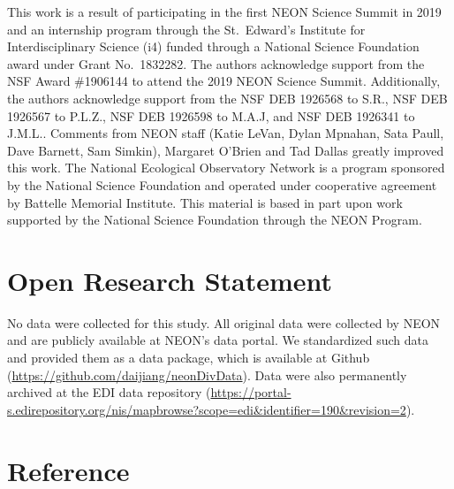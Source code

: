 \documentclass[
  12pt,
]{article}
\begin{document}
This work is a result of participating in the first NEON Science Summit in 2019 and an internship program through the St.~Edward's Institute for Interdisciplinary Science (i4) funded through a National Science Foundation award under Grant No.~1832282. The authors acknowledge support from the NSF Award \#1906144 to attend the 2019 NEON Science Summit. Additionally, the authors acknowledge support from the NSF DEB 1926568 to S.R., NSF DEB 1926567 to P.L.Z., NSF DEB 1926598 to M.A.J, and NSF DEB 1926341 to J.M.L.. Comments from NEON staff (Katie LeVan, Dylan Mpnahan, Sata Paull, Dave Barnett, Sam Simkin), Margaret O'Brien and Tad Dallas greatly improved this work. The National Ecological Observatory Network is a program sponsored by the National Science Foundation and operated under cooperative agreement by Battelle Memorial Institute. This material is based in part upon work supported by the National Science Foundation through the NEON Program.

\hypertarget{open-research-statement}{%
\section{Open Research Statement}\label{open-research-statement}}

No data were collected for this study. All original data were collected by NEON and are publicly available at NEON's data portal. We standardized such data and provided them as a data package, which is available at Github (\url{https://github.com/daijiang/neonDivData}). Data were also permanently archived at the EDI data repository (\url{https://portal-s.edirepository.org/nis/mapbrowse?scope=edi\&identifier=190\&revision=2}).

\hypertarget{reference}{%
\section*{Reference}\label{reference}}
\end{document}

